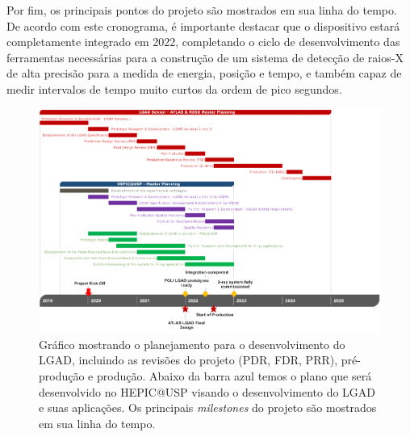 Por fim, os principais pontos do projeto são mostrados em sua linha do tempo. De acordo com este cronograma, é importante destacar que o dispositivo estará completamente integrado em 2022, completando o ciclo de desenvolvimento das ferramentas necessárias para a construção de um sistema de detecção de raios-X de alta precisão para a medida de energia, posição e tempo, e também capaz de medir intervalos de tempo muito curtos da ordem de pico segundos.

\begin{figure}
    \centering
    \includegraphics[width=18.0cm]{assets/cronograma.png}
    \caption{Gráfico mostrando o planejamento para o desenvolvimento do LGAD, incluindo as revisões do projeto (PDR, FDR, PRR), pré-produção e produção. Abaixo da barra azul temos o plano que será desenvolvido no HEPIC@USP visando o desenvolvimento do LGAD e suas aplicações. Os principais {\it milestones} do projeto são mostrados em sua linha do tempo.}
    \label{cronograma}
\end{figure}